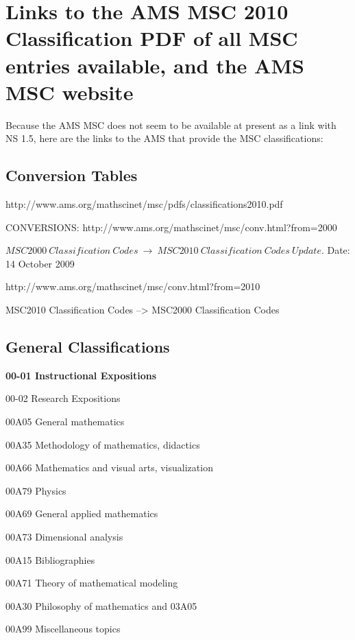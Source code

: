 \documentclass[12pt]{article}
\theoremstyle{plain}
\theoremstyle{definition}
\numberwithin{equation}{section}
\begin{document}
\section{Links to the AMS MSC 2010 Classification PDF of all MSC entries available, and the AMS MSC website}
Because the AMS MSC does not seem to be available at present as a link with NS 1.5, here are the links to 
the AMS that provide the MSC classifications:




\subsection{Conversion Tables}

http://www.ams.org/mathscinet/msc/pdfs/classifications2010.pdf

CONVERSIONS: http://www.ams.org/mathscinet/msc/conv.html?from=2000 


$MSC2000~ Classification~ Codes~ \to  ~MSC2010~ Classification~ Codes ~Update.$
Date: 14 October 2009


http://www.ams.org/mathscinet/msc/conv.html?from=2010

MSC2010 Classification Codes --> MSC2000 Classification Codes


\subsection{General Classifications}
{\bf 00-01 Instructional Expositions}

00-02 Research Expositions

00A05 General mathematics

00A35 Methodology of mathematics, didactics

00A66 Mathematics and visual arts, visualization

00A79 Physics 

00A69 General applied mathematics

00A73 Dimensional analysis

00A15 Bibliographies

00A71 Theory of mathematical modeling 

00A30 Philosophy of mathematics and 03A05

00A99 Miscellaneous topics
\end{document}
